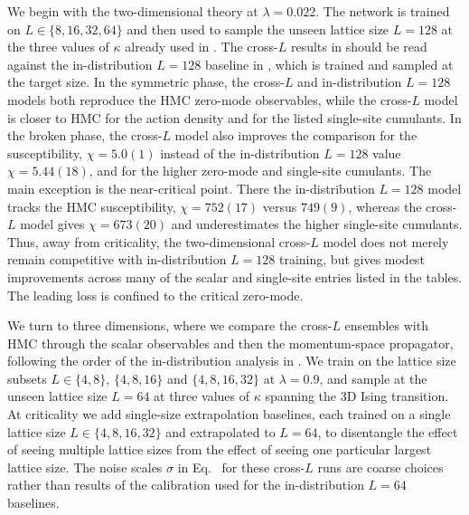 \documentclass[reprint,twocolumn,superscriptaddress,preprintnumbers,amsmath,amssymb,aps,prd,floatfix]{revtex4-2}
\def\Eq#1{Eq.~\labelcref{#1}} \def\Eqs#1{Eqs.~\labelcref{#1}}
\begin{document}
We begin with the two-dimensional theory at $\lambda=0.022$. The network is trained on $L\in\{8,16,32,64\}$ and then used to sample the unseen lattice size $L=128$ at the three values of $\kappa$ already used in . The cross-$L$ results in  should be read against the in-distribution $L=128$ baseline in , which is trained and sampled at the target size. In the symmetric phase, the cross-$L$ and in-distribution $L=128$ models both reproduce the HMC zero-mode observables, while the cross-$L$ model is closer to HMC for the action density and for the listed single-site cumulants. In the broken phase, the cross-$L$ model also improves the comparison for the susceptibility, $\chi=5.0(1)$ instead of the in-distribution $L=128$ value $\chi=5.44(18)$, and for the higher zero-mode and single-site cumulants. The main exception is the near-critical point. There the in-distribution $L=128$ model tracks the HMC susceptibility, $\chi=752(17)$ versus $749(9)$, whereas the cross-$L$ model gives $\chi=673(20)$ and underestimates the higher single-site cumulants. Thus, away from criticality, the two-dimensional cross-$L$ model does not merely remain competitive with in-distribution $L=128$ training, but gives modest improvements across many of the scalar and single-site entries listed in the tables. The leading loss is confined to the critical zero-mode.

We turn to three dimensions, where we compare the cross-$L$ ensembles with HMC through the scalar observables and then the momentum-space propagator, following the order of the in-distribution analysis in . We train on the lattice size subsets $L\in\{4,8\}$, $\{4,8,16\}$ and $\{4,8,16,32\}$ at $\lambda=0.9$, and sample at the unseen lattice size $L=64$ at three values of $\kappa$ spanning the 3D Ising transition. At criticality we add single-size extrapolation baselines, each trained on a single lattice size $L\in\{4,8,16,32\}$ and extrapolated to $L=64$, to disentangle the effect of seeing multiple lattice sizes from the effect of seeing one particular largest lattice size. The noise scales $\sigma$ in \Eq{eq:ve_geometric_g} for these cross-$L$ runs are coarse choices rather than results of the calibration used for the in-distribution $L=64$ baselines.
\end{document}
